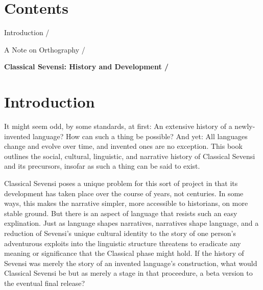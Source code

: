
\chapter{Contents}
\pagestyle{simple}
\begin{table}[hbp]

\begin{small}

Introduction / \pageref{introduction}

\medskip

A Note on Orthography / \pageref{orthography}

\end{small}

\bigskip

\textbf{Classical Sevensi: History and Development / \pageref{text}}

\end{table}


\chapter{Introduction} \label{introduction}

It might seem odd, by some standards, at first: An extensive history of a newly-invented language?
How can such a thing be possible?
And yet: All languages change and evolve over time, and invented ones are no exception.
This book outlines the social, cultural, linguistic, and narrative history of Classical Sevensi and its precursors, insofar as such a thing can be said to exist.

Classical Sevensi poses a unique problem for this sort of project in that its development has taken place over the course of years, not centuries.
In some ways, this makes the narrative simpler, more accessible to historians, on more stable ground.
But there is an aspect of language that resists such an easy explination.
Just as language shapes narratives, narratives shape language, and a reduction of Sevensi's unique cultural identity to the story of one person's adventurous exploits into the linguistic structure threatens to eradicate any meaning or significance that the Classical phase might hold.
If the history of Sevensi was merely the story of an invented language's construction, what would Classical Sevensi be but as merely a stage in that proceedure, a beta version to the eventual final release?

